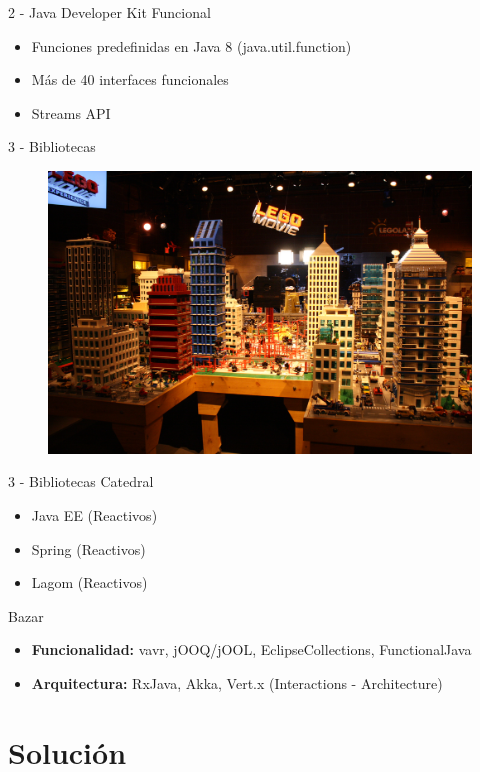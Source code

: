 \documentclass{beamer}
\begin{document}
\begin{frame}{2 - Java Developer Kit Funcional}
\begin{itemize}
\item Funciones predefinidas en Java 8 (java.util.function)
\item Más de 40 interfaces funcionales
\item Streams API
\end{itemize}
\end{frame}


\begin{frame}{3 - Bibliotecas}
\begin{figure}
\centering
\includegraphics[width=0.9\linewidth]{Images/lego-movie}
\end{figure}
\end{frame}

\begin{frame}{3 - Bibliotecas}
Catedral
\begin{itemize}
\item Java EE (Reactivos)
\item Spring (Reactivos)
\item Lagom (Reactivos)
\end{itemize}

Bazar
\begin{itemize}
\item \textbf{Funcionalidad:} vavr, jOOQ/jOOL, EclipseCollections, FunctionalJava
\item \textbf{Arquitectura:} RxJava, Akka, Vert.x (Interactions - Architecture)
\end{itemize}
\end{frame}

\section{Solución}
\end{document}
